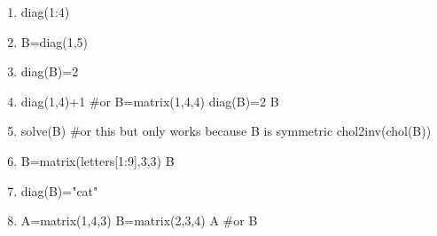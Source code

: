 \begin{enumerate}
\item
\begin{Schunk}
\begin{Sinput}
 diag(1:4)
\end{Sinput}
\end{Schunk}

\item
\begin{Schunk}
\begin{Sinput}
 B=diag(1,5)
\end{Sinput}
\end{Schunk}

\item
\begin{Schunk}
\begin{Sinput}
 diag(B)=2
\end{Sinput}
\end{Schunk}

\item
\begin{Schunk}
\begin{Sinput}
 diag(1,4)+1
 #or
 B=matrix(1,4,4)
 diag(B)=2
 B
\end{Sinput}
\end{Schunk}

\item
\begin{Schunk}
\begin{Sinput}
 solve(B)
 #or this but only works because B is symmetric
 chol2inv(chol(B))
\end{Sinput}
\end{Schunk}

\item
\begin{Schunk}
\begin{Sinput}
 B=matrix(letters[1:9],3,3)
 B
\end{Sinput}
\end{Schunk}

\item
\begin{Schunk}
\begin{Sinput}
 diag(B)="cat"
\end{Sinput}
\end{Schunk}

\item
\begin{Schunk}
\begin{Sinput}
 A=matrix(1,4,3)
 B=matrix(2,3,4)
 A%*%B
 #or
 B%*%A
\end{Sinput}
\end{Schunk}


\end{enumerate}
